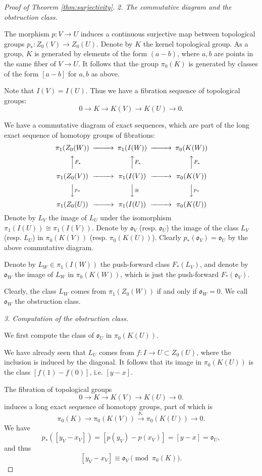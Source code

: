 \documentclass{amsart}
\theoremstyle{definition}
\theoremstyle{remark}
\begin{document}
\begin{proof}[Proof of Theorem \ref{thm:surjectivity}]
\textit{2. The commutative diagram and the obstruction class.}

The morphism $p: V \to U$ induces a continuous surjective map between topological groups $p_*: Z_0(V) \to Z_0(U)$. 
Denote by $K$ the kernel topological group. As a group, $K$ is generated by elements of the form $(a-b)$, where $a, b$ are points in the same fiber of $V \to U$.
It follows that the group $\pi_0(K)$ is generated by classes of the form $[a-b]$ for $a, b$ as above.

Note that $I(V)=I(U)$. Thus we have a fibration sequence of topological groups:
\[
0 \to K \to K(V) \to K(U) \to 0.
\]


We have a commutative diagram of exact sequences, which are part of the long exact sequence of homotopy groups of fibrations:
\[
\begin{CD}
\pi_1(Z_0(W)) @>>> \pi_1(I(W)) @>>> \pi_0(K(W))\\
@AAF_*A @AAF_*A @AAF_*A\\
\pi_1(Z_0(V)) @>>> \pi_1(I(V)) @>>> \pi_0(K(V)) \\
@VVp_*V @VV\cong V @VVp_*V\\
\pi_1(Z_0(U)) @>>> \pi_1(I(U)) @>>> \pi_0(K(U))\\
\end{CD}
\]
Denote by $L_V$ the image of $L_U$ under the isomorphism $\pi_1(I(U)) \cong \pi_1(I(V))$.
Denote by $\mathfrak{o}_V$ (resp. $\mathfrak{o}_U$) the image of the class $L_V$ (resp. $L_U$) in $\pi_0(K(V))$ (resp. $\pi_0(K(U))$).
Clearly $p_*(\mathfrak{o}_V)=\mathfrak{o}_U$ by the above commutative diagram.

Denote by $L_W \in \pi_1(I(W))$ the push-forward class $F_*(L_V)$, and denote by $\mathfrak{o}_W$ the image of $L_W$ in $\pi_0(K(W))$, which is just the push-forward $F_*(\mathfrak{o}_V)$.

Clearly, the class $L_W$ comes from $\pi_1(Z_0(W))$ if and only if $\mathfrak{o}_W=0$. We call $\mathfrak{o}_W$ the obstruction class.

\textit{3. Computation of the obstruction class.}

We first compute the class of $\mathfrak{o}_U$ 
in $\pi_0(K(U))$.

We have already seen that $L_U$ comes from $f:I \to U \subset Z_0(U)$, where the inclusion is induced by the diagonal.  
It follows that its image in $\pi_0(K(U))$ is the class $[f(1)-f(0)]$, i.e. $[y-x]$.


The fibration of topological groups 
\[
0 \to K \to K(V) \to K(U) \to 0.
\]
induces a long exact sequence of homotopy groups, part of which is
\[
\pi_0(K) \to \pi_0(K(V)) \xrightarrow{p_*} \pi_0(K(U)) \to 0.
\]
We have $$p_*([y_V-x_V])=[p(y_V)-p(x_V)]=[y-x]=\mathfrak{o}_U,$$ and thus  
\[
[y_V-x_V]\equiv\mathfrak{o}_V \pmod{\pi_0(K)}.
\]



\end{proof}
\end{document}
